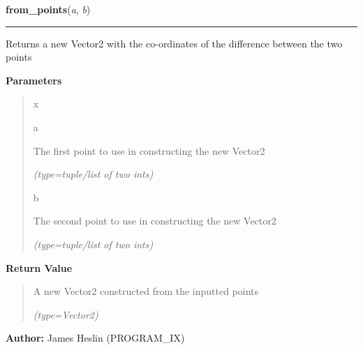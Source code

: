 \hspace{.8\funcindent}\begin{boxedminipage}{\funcwidth}

    \raggedright \textbf{from\_points}(\textit{a}, \textit{b})

    \vspace{-1.5ex}

    \rule{\textwidth}{0.5\fboxrule}
\setlength{\parskip}{2ex}
    Returns a new Vector2 with the co-ordinates of the difference between 
    the two points

\setlength{\parskip}{1ex}
      \textbf{Parameters}
      \vspace{-1ex}

      \begin{quote}
        \begin{Ventry}{x}

          \item[a]

          The first point to use in constructing the new Vector2

            {\it (type=tuple/list of two ints)}

          \item[b]

          The second point to use in constructing the new Vector2

            {\it (type=tuple/list of two ints)}

        \end{Ventry}

      \end{quote}

      \textbf{Return Value}
    \vspace{-1ex}

      \begin{quote}
      A new Vector2 constructed from the inputted points

      {\it (type=Vector2)}

      \end{quote}

\textbf{Author:} James Heslin (PROGRAM\_IX)



    \end{boxedminipage}

    \label{pystroke:vector2:Vector2:get_magnitude}

